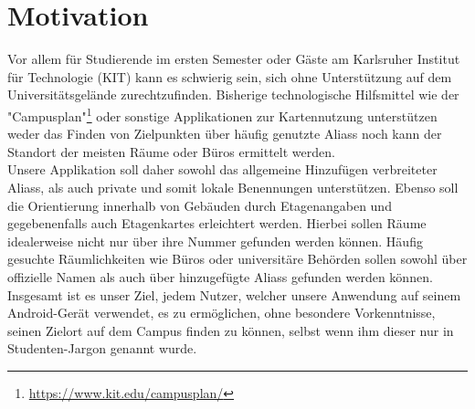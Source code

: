 \chapter{Motivation}

Vor allem für Studierende im ersten Semester oder Gäste am Karlsruher Institut für Technologie (KIT) kann es schwierig sein, 
sich ohne Unterstützung auf dem Universitätsgelände zurechtzufinden. 
Bisherige technologische Hilfsmittel wie der "Campusplan"\footnote{\href{https://www.kit.edu/campusplan/}{https://www.kit.edu/campusplan/}} oder sonstige Applikationen 
zur Kartennutzung unterstützen weder das Finden von Zielpunkten über häufig genutzte \Glspl{Alias} noch kann der Standort der meisten Räume oder Büros ermittelt werden.\\
Unsere Applikation soll daher sowohl das allgemeine Hinzufügen verbreiteter \Glspl{Alias}, als auch private und somit \gls{lokal}e Benennungen unterstützen.
Ebenso soll die Orientierung innerhalb von Gebäuden durch Etagenangaben und gegebenenfalls auch 
\Glspl{Etagenkarte} erleichtert werden. Hierbei sollen Räume idealerweise nicht nur über ihre Nummer gefunden werden können.
Häufig gesuchte Räumlichkeiten wie Büros oder universitäre Behörden sollen sowohl über offizielle Namen als auch 
über hinzugefügte \Glspl{Alias} gefunden werden können.\\
Insgesamt ist es unser Ziel, jedem Nutzer, welcher unsere Anwendung auf seinem \Gls{Android}-Gerät verwendet, es zu ermöglichen, 
ohne besondere Vorkenntnisse, seinen Zielort auf dem \Gls{Campus} finden zu können, selbst wenn ihm dieser nur in \dq Studenten-Jargon\dq{} genannt wurde. 